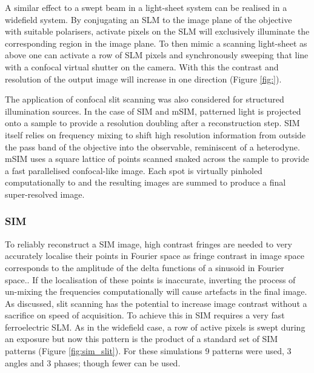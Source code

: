 A similar effect to a swept beam in a light-sheet system can be realised in a widefield system.
By conjugating an SLM to the image plane of the objective with suitable polarisers, activate pixels on the SLM will exclusively illuminate the corresponding region in the image plane.
To then mimic a scanning light-sheet as above one can activate a row of SLM pixels and synchronously sweeping that line with a confocal virtual shutter on the camera.
With this the contrast and resolution of the output image will increase in one direction (Figure \ref{fig:}).

The application of confocal slit scanning was also considered for structured illumination sources.
In the case of SIM and mSIM, patterned light is projected onto a sample to provide a resolution doubling after a reconstruction step.
SIM itself relies on frequency mixing to shift high resolution information from outside the pass band of the objective into the observable, reminiscent of a heterodyne.
mSIM uses a square lattice of points scanned snaked across the sample to provide a fast parallelised confocal-like image.
Each spot is virtually pinholed computationally to and the resulting images are summed to produce a final super-resolved image.

\subsubsection{SIM}

To reliably reconstruct a SIM image, high contrast fringes are needed to very accurately localise their points in Fourier space as fringe contrast in image space corresponds to the amplitude of the delta functions of a sinusoid in Fourier space..
If the localisation of these points is inaccurate, inverting the process of un-mixing the frequencies computationally will cause artefacts in the final image.
As discussed, slit scanning has the potential to increase image contrast without a sacrifice on speed of acquisition.
To achieve this in SIM requires a very fast ferroelectric SLM.
As in the widefield case, a row of active pixels is swept during an exposure but now this pattern is the product of a standard set of SIM patterns (Figure \ref{fig:sim_slit}).
For these simulations 9 patterns were used, 3 angles and 3 phases; though fewer can be used.

